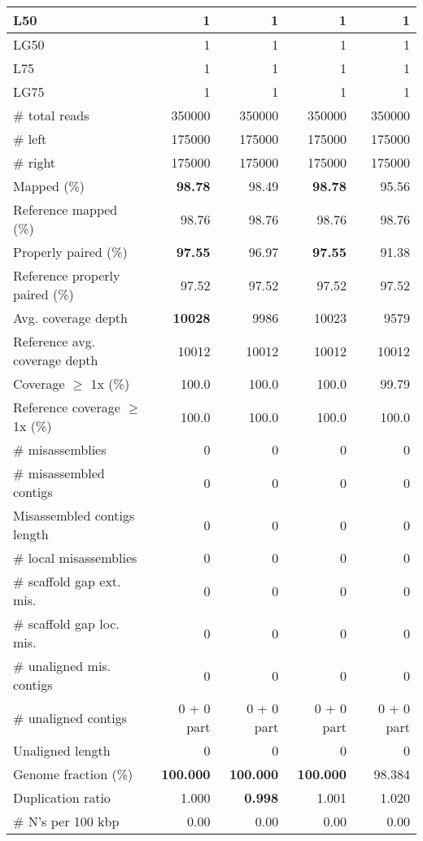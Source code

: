 \documentclass[12pt,a4paper]{article}
\begin{document}
\begin{table}[ht]
\begin{center}
\begin{tabular}{|l*{4}{|r}|}
L50 & 1 & 1 & 1 & 1 \\ \hline
LG50 & 1 & 1 & 1 & 1 \\ \hline
L75 & 1 & 1 & 1 & 1 \\ \hline
LG75 & 1 & 1 & 1 & 1 \\ \hline
\# total reads & 350000 & 350000 & 350000 & 350000 \\ \hline
\# left & 175000 & 175000 & 175000 & 175000 \\ \hline
\# right & 175000 & 175000 & 175000 & 175000 \\ \hline
Mapped (\%) & {\bf 98.78} & 98.49 & {\bf 98.78} & 95.56 \\ \hline
Reference mapped (\%) & 98.76 & 98.76 & 98.76 & 98.76 \\ \hline
Properly paired (\%) & {\bf 97.55} & 96.97 & {\bf 97.55} & 91.38 \\ \hline
Reference properly paired (\%) & 97.52 & 97.52 & 97.52 & 97.52 \\ \hline
Avg. coverage depth & {\bf 10028} & 9986 & 10023 & 9579 \\ \hline
Reference avg. coverage depth & 10012 & 10012 & 10012 & 10012 \\ \hline
Coverage $\geq$ 1x (\%) & 100.0 & 100.0 & 100.0 & 99.79 \\ \hline
Reference coverage $\geq$ 1x (\%) & 100.0 & 100.0 & 100.0 & 100.0 \\ \hline
\# misassemblies & 0 & 0 & 0 & 0 \\ \hline
\# misassembled contigs & 0 & 0 & 0 & 0 \\ \hline
Misassembled contigs length & 0 & 0 & 0 & 0 \\ \hline
\# local misassemblies & 0 & 0 & 0 & 0 \\ \hline
\# scaffold gap ext. mis. & 0 & 0 & 0 & 0 \\ \hline
\# scaffold gap loc. mis. & 0 & 0 & 0 & 0 \\ \hline
\# unaligned mis. contigs & 0 & 0 & 0 & 0 \\ \hline
\# unaligned contigs & 0 + 0 part & 0 + 0 part & 0 + 0 part & 0 + 0 part \\ \hline
Unaligned length & 0 & 0 & 0 & 0 \\ \hline
Genome fraction (\%) & {\bf 100.000} & {\bf 100.000} & {\bf 100.000} & 98.384 \\ \hline
Duplication ratio & 1.000 & {\bf 0.998} & 1.001 & 1.020 \\ \hline
\# N's per 100 kbp & 0.00 & 0.00 & 0.00 & 0.00 \\ \hline

\end{tabular}
\end{center}
\end{table}
\end{document}

